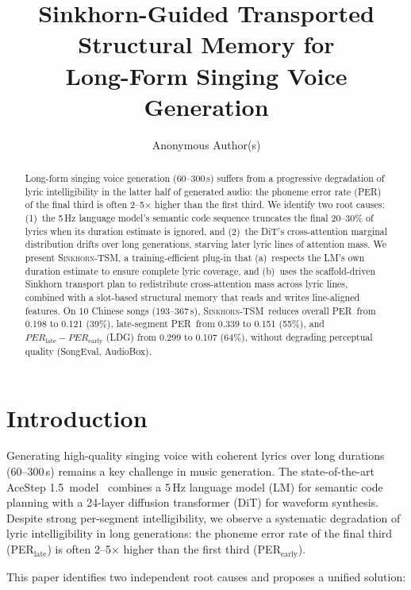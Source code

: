 \documentclass[11pt,a4paper]{article}
\title{\vspace{-1cm}
Sinkhorn-Guided Transported Structural Memory for \\ Long-Form Singing Voice Generation
\vspace{-0.5cm}}
\author{Anonymous Author(s)}
\date{}
\newcommand{\method}{\textsc{Sinkhorn-TSM}}
\newcommand{\dit}{AceStep 1.5}
\newcommand{\per}{PER}
\begin{document}
\maketitle

\begin{abstract}
Long-form singing voice generation (60--300\,s) suffers from a progressive degradation of lyric intelligibility in the latter half of generated audio: the phoneme error rate (\per) of the final third is often 2--5$\times$ higher than the first third. We identify two root causes: (1)~the 5\,Hz language model's semantic code sequence truncates the final 20--30\% of lyrics when its duration estimate is ignored, and (2)~the DiT's cross-attention marginal distribution drifts over long generations, starving later lyric lines of attention mass. We present \method, a training-efficient plug-in that (a)~respects the LM's own duration estimate to ensure complete lyric coverage, and (b)~uses the scaffold-driven Sinkhorn transport plan to redistribute cross-attention mass across lyric lines, combined with a slot-based structural memory that reads and writes line-aligned features. On 10 Chinese songs (193--367\,s), \method~reduces overall \per~from 0.198 to 0.121 (39\%), late-segment \per~from 0.339 to 0.151 (55\%), and $\per_{\text{late}}-\per_{\text{early}}$ (LDG) from 0.299 to 0.107 (64\%), without degrading perceptual quality (SongEval, AudioBox).
\end{abstract}

\section{Introduction}
\label{sec:intro}

Generating high-quality singing voice with coherent lyrics over long durations (60--300\,s) remains a key challenge in music generation. The state-of-the-art \dit~model~\cite{acestep} combines a 5\,Hz language model (LM) for semantic code planning with a 24-layer diffusion transformer (DiT) for waveform synthesis. Despite strong per-segment intelligibility, we observe a systematic degradation of lyric intelligibility in long generations: the phoneme error rate of the final third (\per$_{\text{late}}$) is often 2--5$\times$ higher than the first third (\per$_{\text{early}}$).

This paper identifies two independent root causes and proposes a unified solution:
\end{document}

